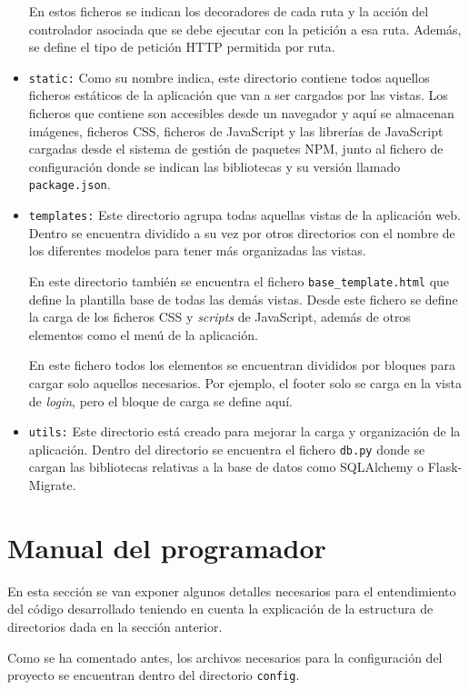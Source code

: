 \begin{itemize}
En estos ficheros se indican los decoradores de cada ruta y la acción del controlador asociada que se debe ejecutar con la petición a esa ruta. 
Además, se define el tipo de petición HTTP permitida por ruta.

\item \texttt{static:} 
Como su nombre indica, este directorio contiene todos aquellos ficheros estáticos de la aplicación que van a ser cargados por las vistas. 
Los ficheros que contiene son accesibles desde un navegador y aquí se almacenan imágenes, ficheros CSS, ficheros de JavaScript y las librerías de JavaScript cargadas desde el sistema de gestión de paquetes NPM, junto al fichero de configuración donde se indican las bibliotecas y su versión llamado \texttt{package.json}.

\item \texttt{templates:}
Este directorio agrupa todas aquellas vistas de la aplicación web.
Dentro se encuentra dividido a su vez por otros directorios con el nombre de los diferentes modelos para tener más organizadas las vistas.

En este directorio también se encuentra el fichero \texttt{base\_template.html} que define la plantilla base de todas las demás vistas.
Desde este fichero se define la carga de los ficheros CSS y \textit{scripts} de JavaScript, además de otros elementos como el menú de la aplicación.

En este fichero todos los elementos se encuentran divididos por bloques para cargar solo aquellos necesarios.
Por ejemplo, el footer solo se carga en la vista de \textit{login}, pero el bloque de carga se define aquí.

\item \texttt{utils:}
Este directorio está creado para mejorar la carga y organización de la aplicación.
Dentro del directorio se encuentra el fichero \texttt{db.py} donde se cargan las bibliotecas relativas a la base de datos como SQLAlchemy o Flask-Migrate.
\end{itemize}

\section{Manual del programador}
En esta sección se van exponer algunos detalles necesarios para el entendimiento del código desarrollado teniendo en cuenta la explicación de la estructura de directorios dada en la sección anterior.

Como se ha comentado antes, los archivos necesarios para la configuración del proyecto se encuentran dentro del directorio \texttt{config}.

